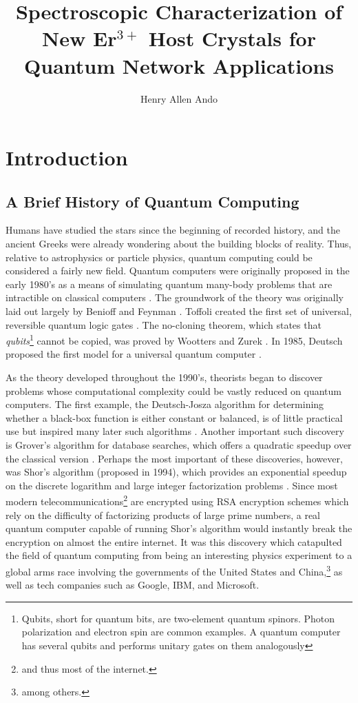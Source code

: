 \documentclass[12pt]{puthesis}
\title{Spectroscopic Characterization of New Er$^{3+}$ Host Crystals for Quantum Network Applications}
\author{Henry Allen Ando}
\begin{document}
\makefrontmatter


\chapter{Introduction}
\section{A Brief History of Quantum Computing}

Humans have studied the stars since the beginning of recorded history, and the ancient Greeks were already wondering about the building blocks of reality. Thus, relative to astrophysics or particle physics, quantum computing could be considered a fairly new field. Quantum computers were originally proposed in the early 1980's as a means of simulating quantum many-body problems that are intractible on classical computers \cite{Feynman1982}. The groundwork of the theory was originally laid out largely by Benioff and Feynman \cite{Benioff1980,Feynman1982}. Toffoli created the first set of universal, reversible quantum logic gates \cite{Toffoli1980}. The no-cloning theorem, which states that \textit{qubits}\footnote{ Qubits, short for quantum bits, are two-element quantum spinors. Photon polarization and electron spin are common examples. A quantum computer has several qubits and performs unitary gates on them analogously } cannot be copied, was proved by Wootters and Zurek \cite{Wootters1982}. In 1985, Deutsch proposed the first model for a universal quantum computer \cite{Deutsch1985}.

As the theory developed throughout the 1990's, theorists began to discover problems whose computational complexity could be vastly reduced on quantum computers. The first example, the Deutsch-Josza algorithm for determining whether a black-box function is either constant or balanced, is of little practical use but inspired many later such algorithms \cite{Deutsch1992}. Another important such discovery is Grover's algorithm for database searches, which offers a quadratic speedup over the classical version \cite{Grover1996}. Perhaps the most important of these discoveries, however, was Shor's algorithm (proposed in 1994), which provides an exponential speedup on the discrete logarithm and large integer factorization problems \cite{Shor1994}. Since most modern telecommunications\footnote{ and thus most of the internet.} are encrypted using RSA encryption schemes which rely on the difficulty of factorizing products of large prime numbers, a real quantum computer capable of running Shor's algorithm would instantly break the encryption on almost the entire internet. It was this discovery which catapulted the field of quantum computing from being an interesting physics experiment to a global arms race involving the governments of the United States and China,\footnote{ among others.} as well as tech companies such as Google, IBM, and Microsoft. 
\end{document}
